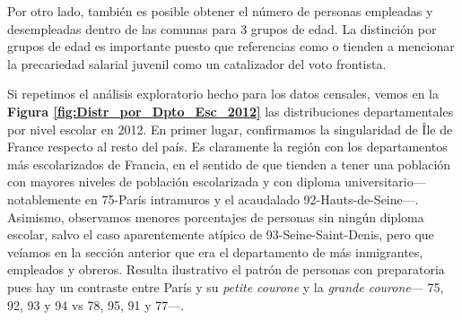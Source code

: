 Por otro lado, también es posible obtener el número de personas empleadas y desempleadas dentro de las comunas para 3 grupos de edad. La distinción por grupos de edad es importante puesto que referencias como \textcite{LeBras16} o \textcite{Perrineau07} tienden a mencionar la precariedad salarial juvenil como un catalizador del voto frontista.\\ 

\begin{table}[h]
\centering
{}
\caption{Otros datos a nivel comuna a utilizar en el análisis.}
\label{tbl:Otros_datos_comuna}
\end{table}

Si repetimos el análisis exploratorio hecho para los datos censales, vemos en la \textbf{Figura \ref{fig:Distr_por_Dpto_Esc_2012}} las distribuciones departamentales por nivel escolar en 2012. En primer lugar, confirmamos la singularidad de Île de France respecto al resto del país. Es claramente la región con los departamentos más escolarizados de Francia, en el sentido de que tienden a tener una población con mayores niveles de población escolarizada y con diploma universitario--- notablemente en 75-París intramuros y el acaudalado 92-Hauts-de-Seine---. Asimismo, observamos menores porcentajes de personas sin ningún diploma escolar, salvo el caso aparentemente atípico de 93-Seine-Saint-Denis, pero que veíamos en la sección anterior que era el departamento de más inmigrantes, empleados y obreros. Resulta ilustrativo el patrón de personas con preparatoria pues hay un contraste entre París y su \textit{petite courone} y la \textit{grande courone}--- 75, 92, 93 y 94 vs 78, 95, 91 y 77---.\\ 

